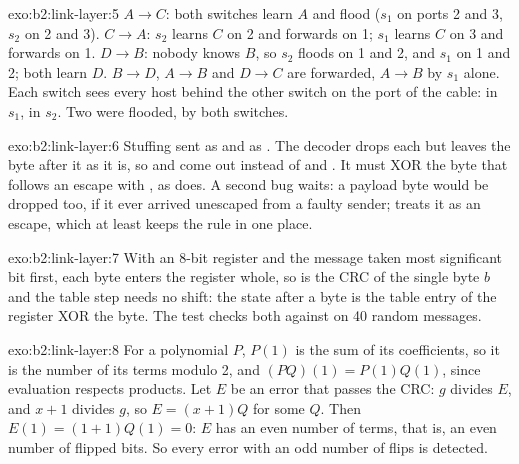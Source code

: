 \begin{solution}{exo:b2:link-layer:5}
$A \to C$: both switches learn $A$ and flood ($s_1$ on ports 2 and 3, $s_2$ on 2 and 3). $C \to A$: $s_2$ learns $C$
on 2 and forwards on 1; $s_1$ learns $C$ on 3 and forwards on 1. $D \to B$: nobody knows $B$, so $s_2$ floods on 1
and 2, and $s_1$ on 1 and 2; both learn $D$. $B \to D$, $A \to B$ and $D \to C$ are forwarded, $A \to B$ by $s_1$
alone. Each switch sees every host behind the other switch on the port of the cable:  in $s_1$,
 in $s_2$. Two  were flooded, by both switches.
\end{solution}

\begin{solution}{exo:b2:link-layer:6}
Stuffing sent  as  and  as . The decoder drops each  but leaves
the byte after it as it is, so  and  come out instead of  and . It must XOR the
byte that follows an escape with , as  does. A second bug waits: a payload byte 
would be dropped too, if it ever arrived unescaped from a faulty sender;  treats it as an escape, which
at least keeps the rule in one place.
\end{solution}

\begin{solution}{exo:b2:link-layer:7}
With an 8-bit register and the message taken most significant bit first, each byte enters the register whole, so
 is the CRC of the single byte $b$ and the table step needs no shift: the state after a byte is the
table entry of the register XOR the byte. The test checks both against  on 40 random
messages.
\end{solution}

\begin{solution}{exo:b2:link-layer:8}
For a polynomial $P$, $P(1)$ is the sum of its coefficients, so it is the number of its terms modulo 2, and $(PQ)(1) =
P(1)Q(1)$, since evaluation respects products. Let $E$ be an error that passes the CRC: $g$ divides $E$, and $x + 1$
divides $g$, so $E = (x + 1)Q$ for some $Q$. Then $E(1) = (1 + 1)Q(1) = 0$: $E$ has an even number of terms, that is,
an even number of flipped bits. So every error with an odd number of flips is detected.
\end{solution}


